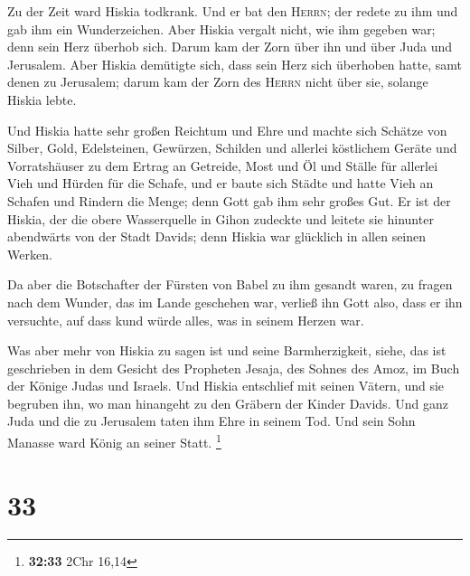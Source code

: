  Zu der Zeit ward Hiskia todkrank. Und er bat den
\textsc{Herrn}; der redete zu ihm und gab ihm ein Wunderzeichen.
 Aber Hiskia vergalt nicht, wie ihm gegeben war; denn
sein Herz überhob sich. Darum kam der Zorn über ihn und über Juda und
Jerusalem.  Aber Hiskia demütigte sich, dass sein Herz
sich überhoben hatte, samt denen zu Jerusalem; darum kam der Zorn des
\textsc{Herrn} nicht über sie, solange Hiskia lebte.

 Und Hiskia hatte sehr großen Reichtum und Ehre und
machte sich Schätze von Silber, Gold, Edelsteinen, Gewürzen, Schilden
und allerlei köstlichem Geräte  und Vorratshäuser zu dem
Ertrag an Getreide, Most und Öl und Ställe für allerlei Vieh und Hürden
für die Schafe,  und er baute sich Städte und hatte Vieh
an Schafen und Rindern die Menge; denn Gott gab ihm sehr großes Gut.
 Er ist der Hiskia, der die obere Wasserquelle in Gihon
zudeckte und leitete sie hinunter abendwärts von der Stadt Davids; denn
Hiskia war glücklich in allen seinen Werken.

 Da aber die Botschafter der Fürsten von Babel zu ihm
gesandt waren, zu fragen nach dem Wunder, das im Lande geschehen war,
verließ ihn Gott also, dass er ihn versuchte, auf dass kund würde alles,
was in seinem Herzen war.

 Was aber mehr von Hiskia zu sagen ist und seine
Barmherzigkeit, siehe, das ist geschrieben in dem Gesicht des Propheten
Jesaja, des Sohnes des Amoz, im Buch der Könige Judas und Israels.
 Und Hiskia entschlief mit seinen Vätern, und sie
begruben ihn, wo man hinangeht zu den Gräbern der Kinder Davids. Und
ganz Juda und die zu Jerusalem taten ihm Ehre in seinem Tod. Und sein
Sohn Manasse ward König an seiner Statt. \footnote{\textbf{32:33} 2Chr
  16,14}

\hypertarget{section-5}{%
\section{33}\label{section-5}}

